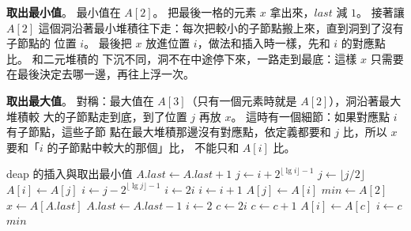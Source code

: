 \textbf{取出最小值}。 最小值在 $A[2]$。 把最後一格的元素 $x$ 拿出來，$\mathit{last}$ 減 $1$。
接著讓 $A[2]$ 這個洞沿著最小堆積往下走：每次把較小的子節點搬上來，直到洞到了沒有子節點的
位置 $i$。 最後把 $x$ 放進位置 $i$，做法和插入時一樣，先和 $i$ 的對應點比。 和二元堆積的
下沉不同，洞不在中途停下來，一路走到最底：這樣 $x$ 只需要在最後決定去哪一邊，再往上浮一次。

\textbf{取出最大值}。 對稱：最大值在 $A[3]$（只有一個元素時就是 $A[2]$），洞沿著最大堆積較
大的子節點走到底，到了位置 $j$ 再放 $x$。 這時有一個細節：如果對應點 $i$ 有子節點，這些子節
點在最大堆積那邊沒有對應點，依定義都要和 $j$ 比，所以 $x$ 要和「$i$ 的子節點中較大的那個」比，
不能只和 $A[i]$ 比。

\begin{pseudo}[label=alg:hp-deap]{deap 的插入與取出最小值}
    \State $A.\mathit{last} \gets A.\mathit{last} + 1$
        \State {}
    \Else
        \State {}
    \EndIf
\EndProcedure
\Statex
{} 
    \State $j \gets i + 2^{\lfloor \lg i \rfloor - 1}$ 
        \State $j \gets \lfloor j/2 \rfloor$ 
    \EndIf
        \State $A[i] \gets A[j]$
        \State {}
    \Else
        \State {}
    \EndIf
\EndProcedure
\Statex
{} 
    \State $i \gets j - 2^{\lfloor \lg j \rfloor - 1}$ 
     
        \State $i \gets 2i$
            \State $i \gets i + 1$
        \EndIf
    \EndIf
        \State $A[j] \gets A[i]$
        \State {}
    \Else
        \State {}
    \EndIf
\EndProcedure
\Statex
{} 
    \State $\mathit{min} \gets A[2]$
    \State $x \gets A[A.\mathit{last}]$
    \State $A.\mathit{last} \gets A.\mathit{last} - 1$
        \State $i \gets 2$
         
            \State $c \gets 2i$
                \State $c \gets c + 1$
            \EndIf
            \State $A[i] \gets A[c]$
            \State $i \gets c$
        \EndWhile
        \State {}
    \EndIf
    \State \Return $\mathit{min}$
\EndFunction
\end{pseudo}

